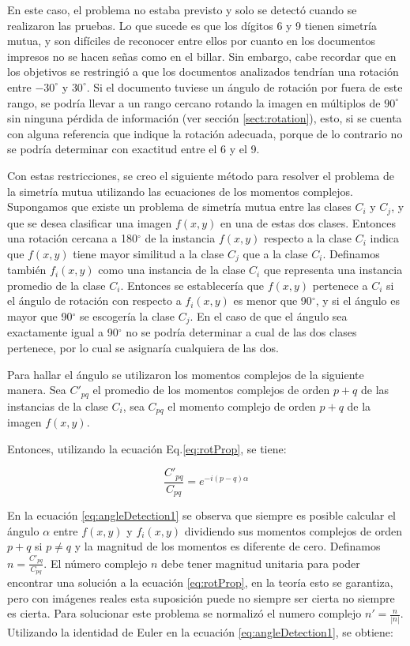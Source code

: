 \documentclass[a4paper, 11pt, oneside]{report}
\begin{document}
En este caso, el problema no estaba previsto y solo se detectó cuando se realizaron las pruebas. Lo que sucede es que los dígitos 6 y 9 tienen simetría mutua, y son difíciles de reconocer entre ellos por cuanto en los documentos impresos no se hacen señas como en el billar. Sin embargo, cabe recordar que en los objetivos se restringió a que los documentos analizados tendrían una rotación entre $-30^\circ$ y $30^\circ$. Si el documento tuviese un ángulo de rotación por fuera de este rango, se podría llevar a un rango cercano rotando la imagen en múltiplos de $90^\circ$ sin ninguna pérdida de información (ver sección \ref{sect:rotation}), esto, si se cuenta con alguna referencia que indique la rotación adecuada, porque de lo contrario no se podría determinar con exactitud entre el 6 y el 9.

Con estas restricciones, se creo el siguiente método para resolver el problema de la simetría mutua utilizando las ecuaciones de los momentos complejos. Supongamos que existe un problema de simetría mutua entre las clases $C_i$ y $C_j$, y que se desea clasificar una imagen $f(x,y)$ en una de estas dos clases. Entonces una rotación cercana a 180$^\circ$ de la instancia $f(x,y)$ respecto a la clase $C_i$ indica que $f(x,y)$ tiene mayor similitud a la clase $C_j$ que a la clase $C_i$. Definamos también $f_i(x,y)$ como una instancia de la clase $C_i$ que representa una instancia promedio de la clase $C_i$. Entonces se establecería que $f(x,y)$ pertenece a $C_i$ si el ángulo de rotación con respecto a $f_i(x,y)$ es menor que 90$^\circ$, y si el ángulo es mayor que 90$^\circ$ se escogería la clase $C_j$. En el caso de que el ángulo sea exactamente igual a 90$^\circ$ no se podría determinar a cual de las dos clases pertenece, por lo cual se asignaría  cualquiera de las dos.

Para hallar el ángulo se utilizaron los momentos complejos de la siguiente manera. Sea $C'_{pq}$ el promedio de los momentos complejos de orden $p+q$ de las instancias de la clase $C_i$, sea $C_{pq}$ el momento complejo de orden $p+q$ de la imagen $f(x,y)$.

Entonces, utilizando la ecuación Eq.\ref{eq:rotProp}, se tiene:

	\begin{equation}\label{eq:angleDetection1}
		\frac{C'_{pq}}{C_{pq}} = e^{-i(p-q)\alpha}
	\end{equation}

En la ecuación \ref{eq:angleDetection1} se observa que siempre es posible calcular el ángulo $\alpha$ entre $f(x,y)$ y $f_i(x,y)$ dividiendo sus momentos complejos de orden $p+q$ si $p \neq q$ y la magnitud de los momentos es diferente de cero. Definamos $n=\frac{C'_{pq}}{C_{pq}}$. El número complejo $n$ debe tener magnitud unitaria para poder encontrar una solución a la ecuación \ref{eq:rotProp}, en la teoría esto se garantiza, pero con imágenes reales esta suposición puede no siempre ser cierta no siempre es cierta. Para solucionar este problema se normalizó el numero complejo $n'=\frac{n}{|n|}$. Utilizando la identidad de Euler en la ecuación \ref{eq:angleDetection1}, se obtiene:
\end{document}
